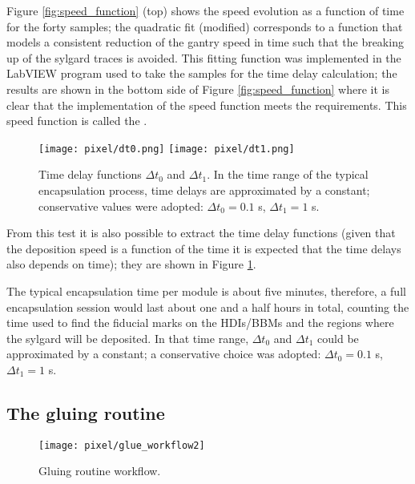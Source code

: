 Figure \ref{fig:speed_function} (top) shows the speed evolution as a function of time for the forty samples; the quadratic fit (modified) corresponds to a function that models a consistent reduction of the gantry speed in time such that the breaking up of the sylgard traces is avoided. This fitting function was implemented in the LabVIEW program used to take the samples for the time delay calculation; the results are shown in the bottom side of Figure \ref{fig:speed_function} where it is clear that the implementation of the speed function meets the requirements. This speed function is called the .

\begin{figure}[h]
  \centering
    \texttt{[image: pixel/dt0.png]} 
    \texttt{[image: pixel/dt1.png]}
    \caption[Time delay functions.]{Time delay functions $\Delta t_0$ and $\Delta t_1$. In the time range of the typical encapsulation process, time delays are approximated by a constant; conservative values were adopted:  $\Delta t_0 =0.1$ s,  $\Delta t_1 = 1$ s.}\label{fig:time_delay_functions}
\end{figure}

From this test it is also possible to extract the time delay functions (given that the deposition speed is a function of the time it is expected that the time delays also depends on time); they are shown in Figure \ref{fig:time_delay_functions}.

The typical encapsulation time per module is about five minutes, therefore, a full encapsulation session would last about one and a half hours in total, counting the time used to find the fiducial marks on the HDIs/BBMs and the regions where the sylgard will be deposited. In that time range, $\Delta t_0$ and $\Delta t_1$ could be approximated by a constant; a conservative choice was adopted: $\Delta t_0 =0.1$ s,  $\Delta t_1 = 1$ s.            

\subsection{The gluing routine}

\begin{figure}[h]
 \centering
    \texttt{[image: pixel/glue\_workflow2]}
    \caption[Gluing routine workflow.]{Gluing routine workflow.}\label{fig:glue_workflow}
\end{figure}

